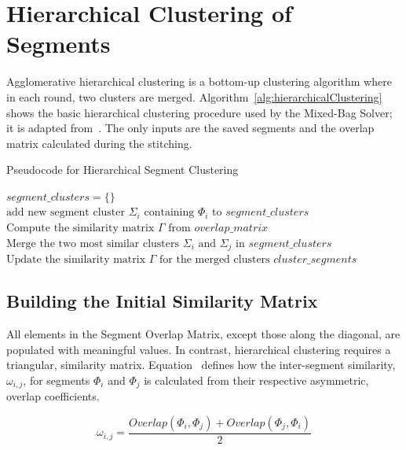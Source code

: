 \section{Hierarchical Clustering of Segments}\label{sec:hierarchicalClustering}

Agglomerative hierarchical clustering is a bottom-up clustering algorithm where in each round, two clusters are merged.  Algorithm~\ref{alg:hierarchicalClustering} shows the basic hierarchical clustering procedure used by the Mixed-Bag Solver; it is adapted from~\cite{tanIntroToDataMining}.  The only inputs are the saved segments and the overlap matrix calculated during the stitching.

\begin{algorithm}[t]
\caption{Pseudocode for Hierarchical Segment Clustering}\label{alg:hierarchicalClustering}
\begin{algorithmic}[1]
	\State $\textit{segment\_clusters} = \{ \}$	
		\State $\text{add new segment cluster } \Sigma_i \text{ containing } \Phi_i \text{ to } segment\_clusters$
	\EndFor
    \State $\text{Compute the similarity matrix } \Gamma \text{ from } overlap\_matrix$
    	\State $\text{Merge the two most similar clusters } \Sigma_i \text{ and } \Sigma_j \text{ in } \textit{segment\_clusters}$
    	\State $\text{Update the similarity matrix } \Gamma \text{ for the merged clusters}$
	\EndWhile
    \State \Return $\textit{cluster\_segments}$
\EndFunction
\end{algorithmic}
\end{algorithm}

\subsection{Building the Initial Similarity Matrix}\label{sec:quantifyingSegmentSimilarity}

All elements in the Segment Overlap Matrix, except those along the diagonal, are populated with meaningful values.  In contrast, hierarchical clustering requires a triangular, similarity matrix.  Equation~ defines how the inter-segment similarity, $\omega_{i,j}$, for segments $\Phi_i$ and $\Phi_j$ is calculated from their respective asymmetric, overlap coefficients.

\begin{equation} \label{eq:segmentSimilarity}
\omega_{i,j} = \frac{Overlap(\Phi_i, \Phi_j) + Overlap(\Phi_j, \Phi_i)}{2} 
\end{equation}


